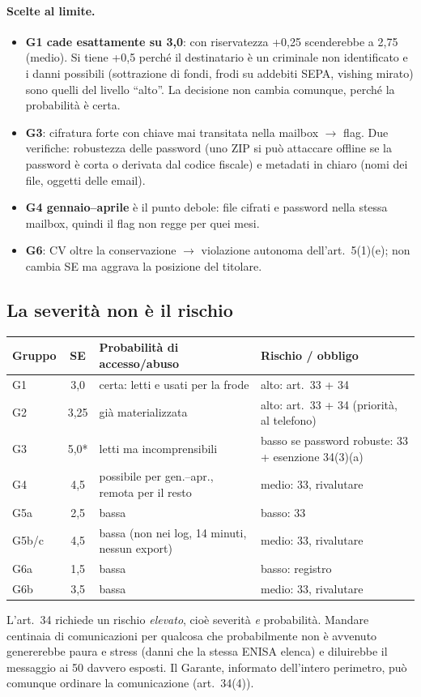 \paragraph{Scelte al limite.}
\begin{itemize}
  \item \textbf{G1 cade esattamente su 3,0}: con riservatezza +0,25 scenderebbe a 2,75 (medio). Si
    tiene +0,5 perché il destinatario è un criminale non identificato e i danni possibili
    (sottrazione di fondi, frodi su addebiti SEPA, vishing mirato) sono quelli del livello ``alto''. La
    decisione non cambia comunque, perché la probabilità è certa.
  \item \textbf{G3}: cifratura forte con chiave mai transitata nella mailbox $\rightarrow$ flag. Due
    verifiche: robustezza delle password (uno ZIP si può attaccare offline se la password è corta o
    derivata dal codice fiscale) e metadati in chiaro (nomi dei file, oggetti delle email).
  \item \textbf{G4 gennaio--aprile} è il punto debole: file cifrati e password nella stessa mailbox,
    quindi il flag non regge per quei mesi.
  \item \textbf{G6}: CV oltre la conservazione $\rightarrow$ violazione autonoma dell'art.~5(1)(e); non
    cambia SE ma aggrava la posizione del titolare.
\end{itemize}

\subsection{La severità non è il rischio}
\begin{center}
\small
\begin{tabularx}{\linewidth}{l c X l}
\toprule
\textbf{Gruppo} & \textbf{SE} & \textbf{Probabilità di accesso/abuso} & \textbf{Rischio / obbligo} \\ \midrule
G1 & 3,0 & certa: letti e usati per la frode & alto: art.~33 + 34 \\
G2 & 3,25 & già materializzata & alto: art.~33 + 34 (priorità, al telefono) \\
G3 & 5,0* & letti ma incomprensibili & basso se password robuste: 33 + esenzione 34(3)(a) \\
G4 & 4,5 & possibile per gen.--apr., remota per il resto & medio: 33, rivalutare \\
G5a & 2,5 & bassa & basso: 33 \\
G5b/c & 4,5 & bassa (non nei log, 14 minuti, nessun export) & medio: 33, rivalutare \\
G6a & 1,5 & bassa & basso: registro \\
G6b & 3,5 & bassa & medio: 33, rivalutare \\
\bottomrule
\end{tabularx}
\end{center}
L'art.~34 richiede un rischio \emph{elevato}, cioè severità \emph{e} probabilità. Mandare centinaia di
comunicazioni per qualcosa che probabilmente non è avvenuto genererebbe paura e stress (danni che
la stessa ENISA elenca) e diluirebbe il messaggio ai 50 davvero esposti. Il Garante, informato
dell'intero perimetro, può comunque ordinare la comunicazione (art.~34(4)).

